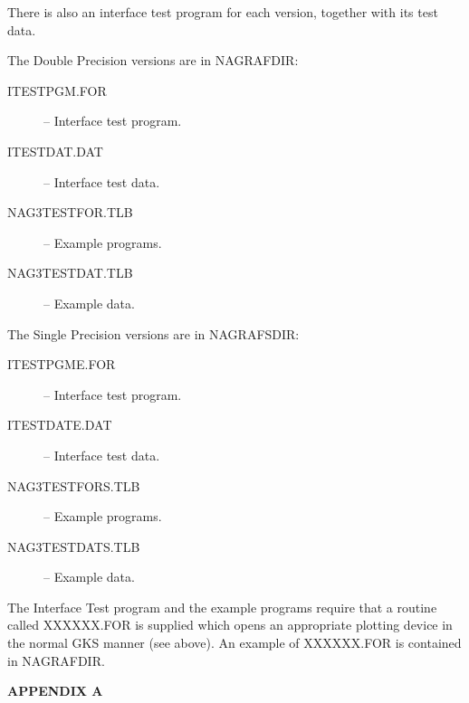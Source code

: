 There is also an interface test program for each version, together with its
test data.

The Double Precision versions are in NAGRAFDIR:
\begin{description}
\item[ITESTPGM.FOR] -- Interface test program.
\item[ITESTDAT.DAT] -- Interface test data.
\item[NAG3TESTFOR.TLB] -- Example programs.
\item[NAG3TESTDAT.TLB] -- Example data.
\end{description}

The Single Precision versions are in NAGRAFSDIR:
\begin{description}
\item[ITESTPGME.FOR] -- Interface test program.
\item[ITESTDATE.DAT] -- Interface test data.
\item[NAG3TESTFORS.TLB] -- Example programs.
\item[NAG3TESTDATS.TLB] -- Example data.
\end{description}

The Interface Test program and the example programs require that a routine
called XXXXXX.FOR is supplied which opens an appropriate plotting device in the
normal GKS manner (see above). An example of XXXXXX.FOR is contained in
NAGRAFDIR.

\newpage
\begin{center}
{\bf APPENDIX A}
\end {center}

